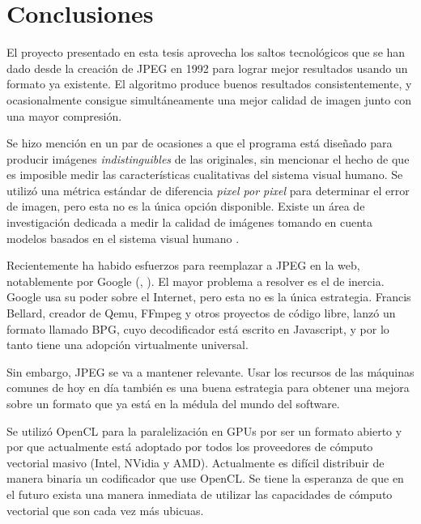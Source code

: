
\chapter{Conclusiones}\label{ch:conclusiones}

El proyecto presentado en esta tesis aprovecha los saltos tecnológicos que se
han dado desde la creación de JPEG en 1992 \cite{jpeg-spec} para lograr mejor
resultados usando un formato ya existente. El algoritmo produce buenos
resultados consistentemente, y ocasionalmente consigue simultáneamente una
mejor calidad de imagen junto con una mayor compresión.

Se hizo mención en un par de ocasiones a que el programa está diseñado para
producir imágenes \emph{indistinguibles} de las originales, sin mencionar el
hecho de que es imposible medir las características cualitativas del sistema
visual humano. Se utilizó una métrica estándar de diferencia \emph{pixel por
pixel} para determinar el error de imagen, pero esta no es la única opción
disponible. Existe un área de investigación dedicada a medir la calidad de
imágenes tomando en cuenta modelos basados en el sistema visual humano
\cite{subjective-paper}.

Recientemente ha habido esfuerzos para reemplazar a JPEG en la web,
notablemente por Google (\cite{brotli}, \cite{webp}). El mayor problema a
resolver es el de inercia. Google usa su poder sobre el Internet, pero esta no
es la única estrategia. Francis Bellard, creador de Qemu, FFmpeg y otros
proyectos de código libre, lanzó un formato llamado \gls{BPG}, cuyo
decodificador está escrito en Javascript, y por lo tanto tiene una adopción
virtualmente universal.

Sin embargo, JPEG se va a mantener relevante. Usar los recursos de las
máquinas comunes de hoy en día también es una buena estrategia para obtener una
mejora sobre un formato que ya está en la médula del mundo del software.

Se utilizó OpenCL para la paralelización en GPUs por ser un formato abierto y
por que actualmente está adoptado por todos los proveedores de cómputo
vectorial masivo (Intel, NVidia y AMD). Actualmente es difícil distribuir de
manera binaria un codificador que use OpenCL. Se tiene la esperanza de que en
el futuro exista una manera inmediata de utilizar las capacidades de cómputo
vectorial que son cada vez más ubicuas.

